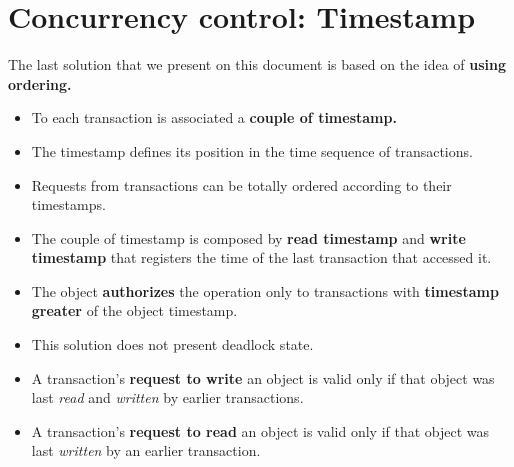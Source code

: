 \section{Concurrency control: Timestamp}
The last solution that we present on this document is based on the idea of \textbf{using ordering.}
\begin{itemize}
    \item To each transaction is associated a \textbf{couple of timestamp.}
    \item The timestamp defines its position in the time sequence of transactions.
    \item Requests from transactions can be totally ordered according to their timestamps. 
    \item The couple of timestamp is composed by \textbf{read timestamp} and \textbf{write timestamp} that registers the time of the last transaction that accessed it.
    \item The object \textbf{authorizes} the operation only to transactions with \textbf{timestamp greater} of the object timestamp.
    \item This solution does not present deadlock state.
    \item A transaction’s \textbf{request to write} an object is valid only if that object was last \textit{read} and \textit{written} by earlier transactions.
    \item A transaction’s \textbf{request to read} an object is valid only if that object was last \textit{written} by an earlier transaction.
\end{itemize}